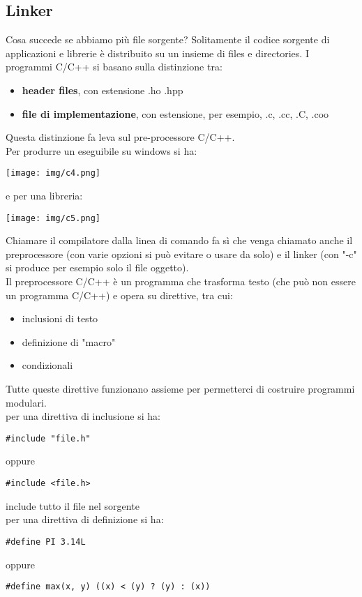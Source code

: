 \documentclass[a4paper,12pt, oneside]{book}
\begin{document}
\subsection{Linker}
Cosa succede se abbiamo più file sorgente? Solitamente il codice sorgente di applicazioni e librerie è distribuito su un insieme di files e directories. I programmi C/C++ si basano sulla distinzione tra:
\begin{itemize}
\item \textbf{header files}, con estensione .ho .hpp
\item \textbf{file di implementazione}, con estensione, per esempio, .c, .cc, .C, .coo
\end{itemize}
Questa distinzione fa leva sul pre-processore C/C++.\\
Per produrre un eseguibile su windows si ha:
\begin{center}
\texttt{[image: img/c4.png]}
\end{center}
e per una libreria:
\begin{center}
\texttt{[image: img/c5.png]}
\end{center}
Chiamare il compilatore dalla linea di comando fa sì
che venga chiamato anche il preprocessore (con varie opzioni si può evitare o usare da solo) e il linker (con "-c" si produce per esempio solo il file oggetto).\\
Il preprocessore C/C++ è un programma che trasforma testo (che può non essere un programma C/C++) e opera su direttive, tra cui:
\begin{itemize}
\item inclusioni di testo
\item definizione di "macro"
\item condizionali
\end{itemize}
Tutte queste direttive funzionano assieme per permetterci di
costruire programmi modulari.\\
per una direttiva di inclusione si ha:
\begin{verbatim}
#include "file.h"
\end{verbatim}
oppure 
\begin{verbatim}
#include <file.h>
\end{verbatim}
include tutto il file nel sorgente\\
per una direttiva di definizione si ha:
\begin{verbatim}
#define PI 3.14L
\end{verbatim}
oppure 
\begin{verbatim}
#define max(x, y) ((x) < (y) ? (y) : (x))
\end{verbatim}
\end{document}
